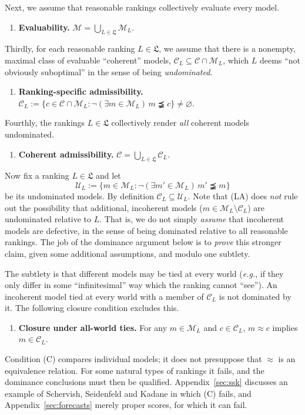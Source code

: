 \documentclass[11pt]{article}
\theoremstyle{definition}
\theoremstyle{remark}
\newcommand{\M}{\mathcal M}
\newcommand{\C}{\mathcal C}
\newcommand{\U}{\mathcal U}
\begin{document}
Next, we assume that reasonable rankings collectively evaluate every model.
\begin{enumerate}[label=\textbf{(E)},leftmargin=*]
\item \textbf{Evaluability.} $\M=\bigcup_{L\in\mathfrak L}\M_L$.
\end{enumerate}

Thirdly, for each reasonable ranking $L\in\mathfrak L$, we assume that there is a nonempty, maximal class of evaluable ``coherent'' models, $\C_L\subseteq\C\cap\M_L$, which $L$ deems ``not obviously suboptimal'' in the sense of being \textit{undominated}.
\begin{enumerate}[label=\textbf{(LA)},leftmargin=*]
\item \textbf{Ranking-specific admissibility.} $\C_L:=\{c\in\C\cap\M_L : \neg(\exists m\in\M_L)\,m\precneqq c\}\neq\varnothing$.
\end{enumerate}

Fourthly, the rankings $L\in\mathfrak L$ collectively render \textit{all} coherent models undominated.
\begin{enumerate}[label=\textbf{(A)},leftmargin=*]
\item \textbf{Coherent admissibility.} $\C=\bigcup_{L\in\mathfrak L}\C_L$.
\end{enumerate}

Now fix a ranking $L\in\mathfrak L$ and let
\[
 \U_L:=\{m\in\M_L:\neg(\exists m'\in\M_L)\,m'\precneqq m\}
\]
be its undominated models. By definition $\C_L\subseteq\U_L$. Note that (LA) does \textit{not} rule out the possibility that additional, incoherent models ($m\in\M_L\setminus\C_L$) are undominated relative to $L$. That is, we do not simply \textit{assume} that incoherent models are defective, in the sense of being dominated relative to all reasonable rankings. The job of the dominance argument below is to \textit{prove} this stronger claim, given some additional assumptions, and modulo one subtlety.

The subtlety is that different models may be tied at every world (\textit{e.g.}, if they only differ in some ``infinitesimal'' way which the ranking cannot ``see''). An incoherent model tied at every world with a member of $\C_L$ is not dominated by it. The following closure condition excludes this.
\begin{enumerate}[label=\textbf{(C)},leftmargin=*]
\item \textbf{Closure under all-world ties.} For any $m\in \M_L$ and $c\in \C_L$, $m\approx c$ implies $m\in \C_L$.
\end{enumerate}
Condition (C) compares individual models; it does not presuppose that $\approx$ is an equivalence relation. For some natural types of rankings it fails, and the dominance conclusions must then be qualified. Appendix~\ref{sec:ssk} discusses an example of Schervish, Seidenfeld and Kadane in which (C) fails, and Appendix~\ref{sec:forecasts} merely proper scores, for which it can fail.
\end{document}
